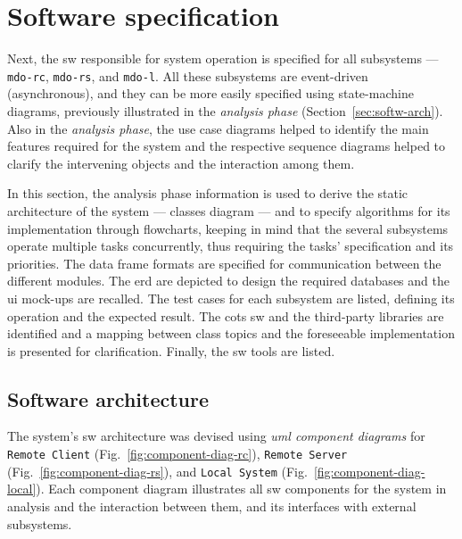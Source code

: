 %
\section{Software specification}
\label{sec:sw-specs}
Next, the \gls{sw} responsible for system operation is specified for all
subsystems --- \texttt{\acrfull{mdo-rc}}, \texttt{\acrfull{mdo-rs}}, and
\texttt{\acrfull{mdo-l}}.
All these subsystems are event-driven (asynchronous), and they can be more easily
specified using state-machine diagrams, previously illustrated in the
\emph{analysis phase} (Section~\ref{sec:softw-arch}). Also in the \emph{analysis
phase}, the use case diagrams helped to identify the main features required for
the system and the respective sequence diagrams helped to clarify the
intervening objects and the interaction among them.

In this section, the analysis phase information is used to derive the static
architecture of the system --- classes diagram --- and to specify algorithms for
its implementation through flowcharts, keeping in mind that the several
subsystems operate multiple tasks concurrently, thus requiring the tasks'
specification and its priorities. The data frame formats are specified for
communication between the different modules. The \acrfull{erd} are depicted to
design the required databases and the \gls{ui} mock-ups are recalled. The test
cases for each subsystem are listed, defining its operation and the expected
result. The \gls{cots} \gls{sw} and the third-party libraries are identified
and a mapping between class topics and the foreseeable implementation is
presented for clarification. Finally, the \gls{sw} tools are listed.

\subsection{Software architecture}
\label{sec:softw-arch-1}
The system's \gls{sw} architecture was devised using \emph{\gls{uml} component
  diagrams} for \texttt{Remote Client} (Fig.~\ref{fig:component-diag-rc}), \texttt{Remote Server} (Fig.~\ref{fig:component-diag-rs}), and
\texttt{Local System} (Fig.~\ref{fig:component-diag-local}). Each component
diagram illustrates all \gls{sw} components for the system in analysis and the
interaction between them, and its
interfaces with external subsystems.


